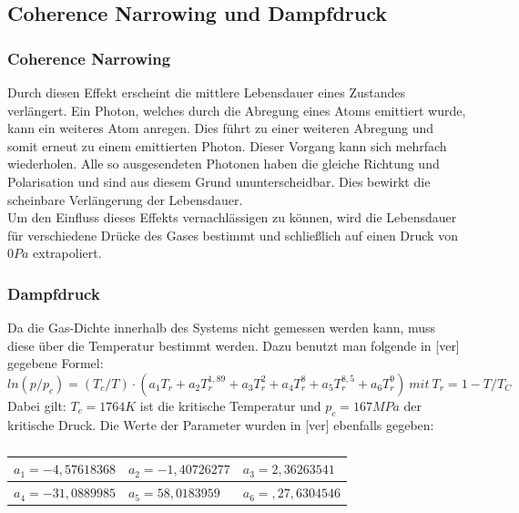 \subsection{Coherence Narrowing und Dampfdruck}
\subsubsection{Coherence Narrowing}
Durch diesen Effekt erscheint die mittlere Lebensdauer eines Zustandes verlängert. Ein Photon, welches durch die Abregung eines Atoms emittiert wurde, kann ein weiteres Atom anregen. Dies führt zu einer weiteren Abregung und somit erneut zu einem emittierten Photon. Dieser Vorgang kann sich mehrfach wiederholen. Alle so ausgesendeten Photonen haben die gleiche Richtung und Polarisation und sind aus diesem Grund ununterscheidbar. Dies bewirkt die scheinbare Verlängerung der Lebensdauer.\\
Um den Einfluss dieses Effekts vernachlässigen zu können, wird die Lebensdauer für verschiedene Drücke des Gases bestimmt und schließlich auf einen Druck von $0 Pa$ extrapoliert.
\subsubsection{Dampfdruck}
Da die Gas-Dichte innerhalb des Systems nicht gemessen werden kann, muss diese über die Temperatur bestimmt werden. Dazu benutzt man folgende in [ver] gegebene Formel: \[ln(p/p_{c})=(T_{c}/T)\cdot(a_{1}T_{r}+a_{2}T_{r}^{1,89}+a_{3}T_{r}^{2}+a_{4}T_{r}^{8}+a_{5}T_{r}^{8,5}+a_{6}T_{r}^{9})~mit~T_{r}=1-T/T_{C}\]
Dabei gilt: $T_{c}=1764K$ ist die kritische Temperatur und $p_{c}=167MPa$ der kritische Druck. Die Werte der Parameter wurden in [ver] ebenfalls gegeben:\\
\begin{table}[htbp]
\begin{center}
\caption{}
\begin{tabular}{|l|l|l|}
\hline
$a_{1}=-4,57618368$ & $a_{2}=-1,40726277$ & $a_{3}=2,36263541$ \\ \hline
$a_{4}=-31,0889985$ & $a_{5}=58,0183959$ & $a_{6}=,27,6304546$ \\ \hline
\end{tabular}
\end{center}
\end{table}

